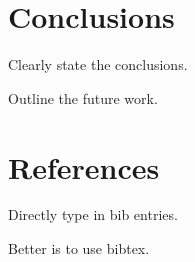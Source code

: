 \documentclass[]{article}
\begin{document}
\section{Conclusions}

Clearly state the conclusions.

Outline the future work.

\section*{References}

Directly type in bib entries.

Better is to use bibtex.
\end{document}

